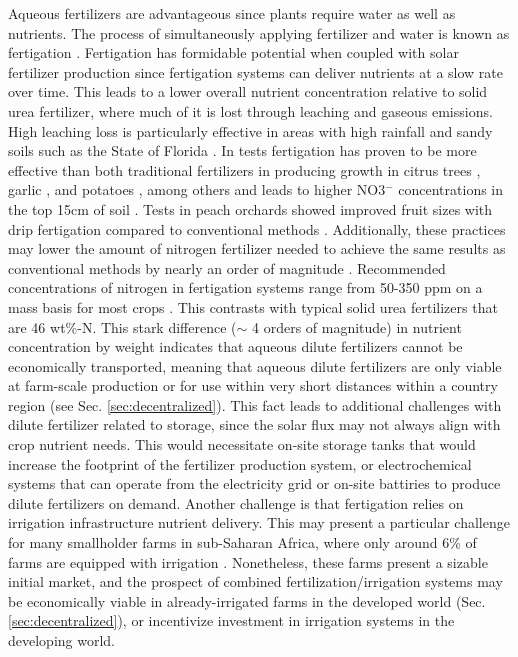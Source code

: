 Aqueous fertilizers are advantageous since plants require water as well as nutrients. The process of simultaneously applying fertilizer and water is known as fertigation \cite{kafkafi2011fertigation,goyal2016water}. Fertigation has formidable potential when coupled with solar fertilizer production since fertigation systems can deliver nutrients at a slow rate over time. This leads to a lower overall nutrient concentration relative to solid urea fertilizer, where much of it is lost through leaching and gaseous emissions. High leaching loss is particularly effective in areas with high rainfall and sandy soils such as the State of Florida \cite{kadyampakeni_2015}. In tests fertigation has proven to be more effective than both traditional fertilizers in producing growth in citrus trees \cite{Morgan2009}, garlic \cite{Jamil_Mohammad_2002}, and potatoes \cite{Feng_2017}, among others \cite{Bar_Yosef_1999,kafkafi2011fertigation} and leads to higher NO3$^-$ concentrations in the top 15cm of soil \cite{Willis1991}. Tests in peach orchards showed improved fruit sizes with drip fertigation compared to conventional methods \cite{Bryla2005}. Additionally, these practices may lower the amount of nitrogen fertilizer needed to achieve the same results as conventional methods by nearly an order of magnitude \cite{kadyampakeni_2015}. 
Recommended concentrations of nitrogen in fertigation systems range from 50-350 ppm on a mass basis for most crops \cite{phocaides2007handbook,Papadopoulos_1988}. This contrasts with typical solid urea fertilizers that are 46 wt\%-N. This stark difference ($\sim$ 4 orders of magnitude) in nutrient concentration by weight indicates that aqueous dilute fertilizers cannot be economically transported, meaning that aqueous dilute fertilizers are only viable at farm-scale production or for use within very short distances within a country region (see Sec. \ref{sec:decentralized}). This fact leads to additional challenges with dilute fertilizer related to storage, since the solar flux may not always align with crop nutrient needs. This would necessitate on-site storage tanks that would increase the footprint of the fertilizer production system, or electrochemical systems that can operate from the electricity grid or on-site battiries to produce dilute fertilizers on demand. Another challenge is that fertigation relies on irrigation infrastructure nutrient delivery. This may present a particular challenge for many smallholder farms in sub-Saharan Africa, where only around 6\%  of farms are equipped with irrigation \cite{You_2011}. Nonetheless, these farms present a sizable initial market, and the prospect of combined fertilization/irrigation systems may be economically viable in already-irrigated farms in the developed world (Sec. \ref{sec:decentralized}), or incentivize investment in irrigation systems in the developing world.

